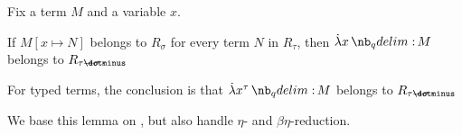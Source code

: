 \begin{lemma}\label{thm:reducibility_candidate_abstraction}
  Fix a term \( M \) and a variable \( x \).

  If \( M[x \mapsto N] \) belongs to \( R_\sigma \) for every term \( N \) in \( R_\tau \), then \( \qabs x M \) belongs to \( R_{\tau \synimplies \sigma} \).

  For typed terms, the conclusion is that \( \qabs {x^\tau} M \) belongs to \( R_{\tau \synimplies \sigma} \).
\end{lemma}
\begin{comments}
  \item We base this lemma on , but also handle \( \eta \)- and \( \beta\eta \)-reduction.
\end{comments}
